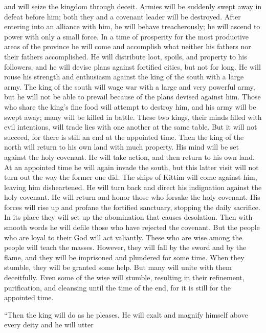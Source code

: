 {and will seize
the kingdom
through deceit.
Armies
will be suddenly swept away
in defeat
before
him; both
they and a covenant
leader will be destroyed.
After entering
into an alliance
with him,
he will behave
treacherously;
he will ascend
to power
with only a small
force.
In a time
of prosperity
for the most productive areas
of the province
he will come
and accomplish
what
neither
his fathers
nor
their fathers
accomplished.
He will distribute
loot,
spoils,
and property
to his followers,
and he will devise
plans
against
fortified cities,
but not for long.
He will rouse
his strength
and enthusiasm
against
the king
of the south
with a large
army.
The king
of the south
will wage
war
with a large
and very
powerful
army,
but he will not
be able
to prevail
because
of the plans
devised
against him.
Those who share
the king’s fine food
will attempt to destroy
him, and his army
will be swept away;
many
will be killed in battle.
These two
kings,
their minds
filled with evil intentions,
will trade
lies
with one
another at the same
table.
But it will not
succeed,
for
there is still
an end
at the appointed time.
Then the king of the north will return
to his own land
with much
property.
His mind
will be set against
the holy
covenant.
He
will take action,
and then return
to his own land.
At an appointed
time he will again
invade
the south,
but this latter
visit will not
turn
out the way the former one did.
The ships
of Kittim
will come
against him, leaving him disheartened.
He will turn back
and direct his indignation
against
the holy
covenant.
He will return
and honor
those who forsake
the holy
covenant.
His forces
will rise up
and profane
the fortified
sanctuary,
stopping
the daily
sacrifice. In its place they will set up
the abomination
that causes desolation.
Then with smooth
words he will defile
those who have rejected the covenant.
But the people
who are loyal to their God
will act
valiantly.
These who are wise
among the people
will teach
the masses.
However, they will fall
by the sword
and by the flame,
and they will be imprisoned
and plundered
for some time.
When they stumble,
they will be granted
some help.
But many
will unite
with them deceitfully.
Even some
of the wise
will stumble,
resulting
in their refinement,
purification, and cleansing until
the time
of the end,
for
it is still
for the appointed time.
\par }{\PP {}“Then the king
will do
as he pleases.
He will exalt
and magnify
himself above
every
deity
and he will utter
}
